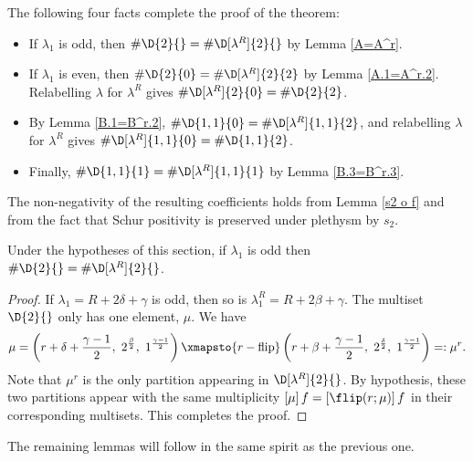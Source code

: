 \documentclass[twoside]{article}
\begin{document}
The following four facts complete the proof of the theorem:
\begin{itemize}
    \item If $\lambda_1$ is odd, then $\#\D{2}{}=\#\D[\lambda^R]{2}{}$ by Lemma \ref{A=A^r}.
    \item If $\lambda_1$ is even, then $\#\D{2}{0}=\#\D[\lambda^R]{2}{2}$ by Lemma \ref{A.1=A^r.2}. Relabelling $\lambda$ for $\lambda^R$ gives $\#\D[\lambda^R]{2}{0}=\#\D{2}{2}$.
    \item By Lemma \ref{B.1=B^r.2}, $\#\D{1,1}{0}=\#\D[\lambda^R]{1,1}{2}$, and relabelling $\lambda$ for $\lambda^R$ gives $\#\D[\lambda^R]{1,1}{0}=\#\D{1,1}{2}$.
    \item Finally, $\#\D{1,1}{1}=\#\D[\lambda^R]{1,1}{1}$ by Lemma \ref{B.3=B^r.3}.
\end{itemize}

The non-negativity of the resulting coefficients holds from Lemma \ref{s2 o f} and from the fact that Schur positivity is preserved under plethysm by $s_2$.

\begin{lem}\label{A=A^r}
Under the hypotheses of this section, if $\lambda_1$ is odd then $\#\D{2}{}=\#\D[\lambda^R]{2}{}$.
\end{lem}
\begin{proof} If $\lambda_1=R+2\delta+\gamma$ is odd, then so is $\lambda_1^R = R+2\beta+\gamma$. The multiset $\D{2}{}$ only has one element, $\mu$. We have
\[\mu = \left(r+\delta+\frac{\gamma-1}{2},\ 2^{\frac{\beta}{2}},\ 1^{\frac{\gamma-1}{2}}\right)
\xmapsto{r-\text{flip}}
\left(r+\beta+\frac{\gamma-1}{2},\ 2^{\frac{\delta}{2}},\ 1^{\frac{\gamma-1}{2}}\right) =: \mu^r.\]
Note that $\mu^r$ is the only partition appearing in $\D[\lambda^R]{2}{}$. By hypothesis, these two partitions appear with the same multiplicity 
$[\mu]\, f = [\flip(r; \mu)] \, f$ in their corresponding multisets. This completes the proof.
\end{proof} %

The remaining lemmas will follow in the same spirit as the previous one.
\end{document}
